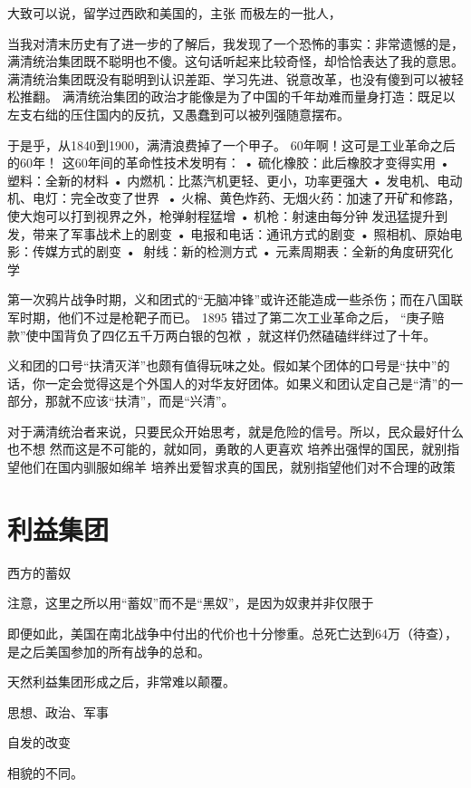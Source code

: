 大致可以说，留学过西欧和美国的，主张
而极左的一批人，


	当我对清末历史有了进一步的了解后，我发现了一个恐怖的事实：非常遗憾的是，满清统治集团既不聪明也不傻。这句话听起来比较奇怪，却恰恰表达了我的意思。满清统治集团既没有聪明到认识差距、学习先进、锐意改革，也没有傻到可以被轻松推翻。
满清统治集团的政治才能像是为了中国的千年劫难而量身打造：既足以左支右绌的压住国内的反抗，又愚蠢到可以被列强随意摆布。

于是乎，从1840到1900，满清浪费掉了一个甲子。
60年啊！这可是工业革命之后的60年！
这60年间的革命性技术发明有：
•	硫化橡胶：此后橡胶才变得实用
•	塑料：全新的材料
•	内燃机：比蒸汽机更轻、更小，功率更强大
•	发电机、电动机、电灯：完全改变了世界
•	火棉、黄色炸药、无烟火药：加速了开矿和修路，使大炮可以打到视界之外，枪弹射程猛增
•	机枪：射速由每分钟发迅猛提升到发，带来了军事战术上的剧变 
•	电报和电话：通讯方式的剧变
•	照相机、原始电影：传媒方式的剧变
•	射线：新的检测方式
•	元素周期表：全新的角度研究化学

第一次鸦片战争时期，义和团式的“无脑冲锋”或许还能造成一些杀伤；而在八国联军时期，他们不过是枪靶子而已。
1895
错过了第二次工业革命之后，
“庚子赔款”使中国背负了四亿五千万两白银的包袱 ，就这样仍然磕磕绊绊过了十年。




义和团的口号“扶清灭洋”也颇有值得玩味之处。假如某个团体的口号是“扶中”的话，你一定会觉得这是个外国人的对华友好团体。如果义和团认定自己是“清”的一部分，那就不应该“扶清”，而是“兴清”。


对于满清统治者来说，只要民众开始思考，就是危险的信号。所以，民众最好什么也不想
然而这是不可能的，就如同，勇敢的人更喜欢
培养出强悍的国民，就别指望他们在国内驯服如绵羊
培养出爱智求真的国民，就别指望他们对不合理的政策

\section{利益集团}

西方的蓄奴

注意，这里之所以用“蓄奴”而不是“黑奴”，是因为奴隶并非仅限于

即便如此，美国在南北战争中付出的代价也十分惨重。总死亡达到64万（待查），是之后美国参加的所有战争的总和。



天然利益集团形成之后，非常难以颠覆。

思想、政治、军事

自发的改变

相貌的不同。

